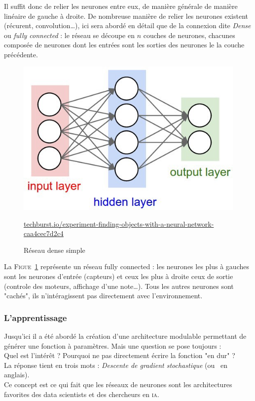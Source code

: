 Il suffit donc de relier les neurones entre eux, de manière générale de manière linéaire de gauche à droite.
De nombreuse manière de relier les neurones existent (récurent, convolution\ldots),
ici sera abordé en détail que de la connexion dite \emph{Dense} ou \emph{fully connected} :
le réseau se découpe en $n$ couches de neurones,
chacunes composée de neurones dont les entrées sont les sorties des neurones le la couche précédente.
\begin{figure}[H]
    \center
    \includegraphics[height=\petit]{pict/net1.jpeg}
	\caption{Réseau dense simple}
    {\tiny \url{techburst.io/experiment-finding-objects-with-a-neural-network-caa4cec7d2c4}}
	\label{fig:simple-dense}
\end{figure}
La \textsc{Figue}\ \ref{fig:simple-dense} représente un réseau fully connected :
les neurones les plus à gauches sont les neurones d'entrée (capteurs)
et ceux les plus à droite ceux de sortie (controle des moteurs, affichage d'une note\ldots).
Tous les autres neurones sont "cachés", ils n'intéragissent pas directement avec l'environnement.


\subsubsection{L'apprentissage}
Jusqu'ici il a été abordé la création d'une architecture modulable permettant de générer une fonction à paramètres.
Mais une question se pose toujours :\\
Quel est l'intérêt ?
Pourquoi ne pas directement écrire la fonction "en dur" ?\\
La réponse tient en trois mots : \textit{Descente de gradient stochastique} (ou  \sgd\ en anglais). \\
Ce concept est ce qui fait que les réseaux de neurones sont les architectures favorites
des data scientists et des chercheurs en \textsc{ia}.\\


